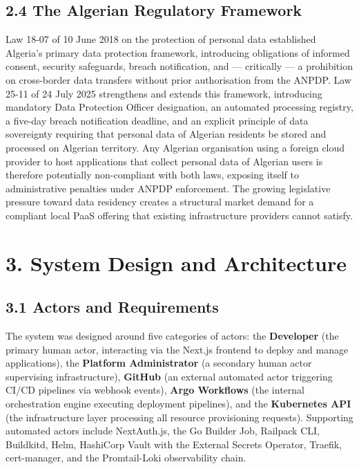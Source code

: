 \subsection*{2.4 The Algerian Regulatory Framework}

Law 18-07 of 10 June 2018 on the protection of personal data established Algeria's primary data protection framework, introducing obligations of informed consent, security safeguards, breach notification, and — critically — a prohibition on cross-border data transfers without prior authorisation from the ANPDP. Law 25-11 of 24 July 2025 strengthens and extends this framework, introducing mandatory Data Protection Officer designation, an automated processing registry, a five-day breach notification deadline, and an explicit principle of data sovereignty requiring that personal data of Algerian residents be stored and processed on Algerian territory. Any Algerian organisation using a foreign cloud provider to host applications that collect personal data of Algerian users is therefore potentially non-compliant with both laws, exposing itself to administrative penalties under ANPDP enforcement. The growing legislative pressure toward data residency creates a structural market demand for a compliant local PaaS offering that existing infrastructure providers cannot satisfy.

\section*{3. System Design and Architecture}

\subsection*{3.1 Actors and Requirements}

The system was designed around five categories of actors: the \textbf{Developer} (the primary human actor, interacting via the Next.js frontend to deploy and manage applications), the \textbf{Platform Administrator} (a secondary human actor supervising infrastructure), \textbf{GitHub} (an external automated actor triggering CI/CD pipelines via webhook events), \textbf{Argo Workflows} (the internal orchestration engine executing deployment pipelines), and the \textbf{Kubernetes API} (the infrastructure layer processing all resource provisioning requests). Supporting automated actors include NextAuth.js, the Go Builder Job, Railpack CLI, Buildkitd, Helm, HashiCorp Vault with the External Secrets Operator, Traefik, cert-manager, and the Promtail-Loki observability chain.

